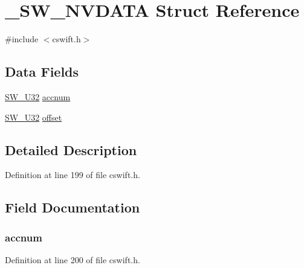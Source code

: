 \hypertarget{struct___s_w___n_v_d_a_t_a}{}\section{\+\_\+\+S\+W\+\_\+\+N\+V\+D\+A\+TA Struct Reference}
\label{struct___s_w___n_v_d_a_t_a}


{\ttfamily \#include $<$cswift.\+h$>$}

\subsection*{Data Fields}
\begin{DoxyCompactItemize}
\item 
\hyperlink{cswift_8h_a1ddf1d5a0d87795e81e41be673cbabeb}{S\+W\+\_\+\+U32} \hyperlink{struct___s_w___n_v_d_a_t_a_a4969cb9c941c4f6cd82daf15dae82854}{accnum}
\item 
\hyperlink{cswift_8h_a1ddf1d5a0d87795e81e41be673cbabeb}{S\+W\+\_\+\+U32} \hyperlink{struct___s_w___n_v_d_a_t_a_abf1566436ece7fb650846bb642a3b1b4}{offset}
\end{DoxyCompactItemize}


\subsection{Detailed Description}


Definition at line 199 of file cswift.\+h.



\subsection{Field Documentation}
\subsubsection[{\texorpdfstring{accnum}{accnum}}]{ accnum}\hypertarget{struct___s_w___n_v_d_a_t_a_a4969cb9c941c4f6cd82daf15dae82854}{}\label{struct___s_w___n_v_d_a_t_a_a4969cb9c941c4f6cd82daf15dae82854}


Definition at line 200 of file cswift.\+h.

